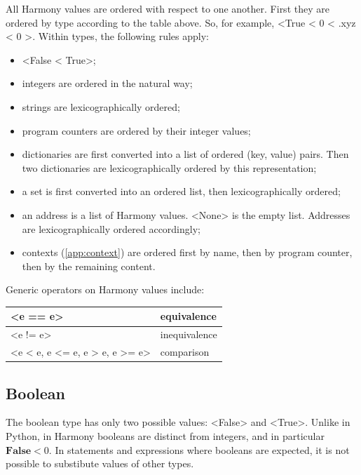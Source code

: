 \documentclass{report}
\begin{document}
All Harmony values are ordered with respect to one another.  First they
are ordered by type according to the table above.
So, for example, <{True < 0 < .xyz < { 0 }}>.
Within types, the following rules apply:

\begin{itemize}
\item <{False < True}>;
\item integers are ordered in the natural way;
\item strings are lexicographically ordered;
\item program counters are ordered by their integer values;
\item dictionaries are first converted into a list of ordered (key, value)
pairs.  Then two dictionaries are lexicographically ordered by this
representation;
\item a set is first converted into an ordered list, then lexicographically
ordered;
\item an address is a list of Harmony values.  <{None}> is the empty list.
Addresses are lexicographically ordered accordingly;
\item contexts (\autoref{app:context}) are ordered first by name, then by program counter, then by the remaining content.
\end{itemize}

Generic operators on Harmony values include:

\begin{center}
\begin{tabular}{|l|l|}
\hline
<{e == e}> & equivalence \\
\hline
<{e != e}> & inequivalence \\
\hline
<{e < e, e <= e, e > e, e >= e}> & comparison\\
\hline
\end{tabular}
\end{center}

\subsection*{Boolean}

The boolean type has only two possible values: <{False}> and
<{True}>.  Unlike in Python, in Harmony booleans are distinct
from integers, and in particular $\mathbf{False} < 0$.  In statements
and expressions where booleans are expected, it is not possible to
substibute values of other types.
\end{document}
